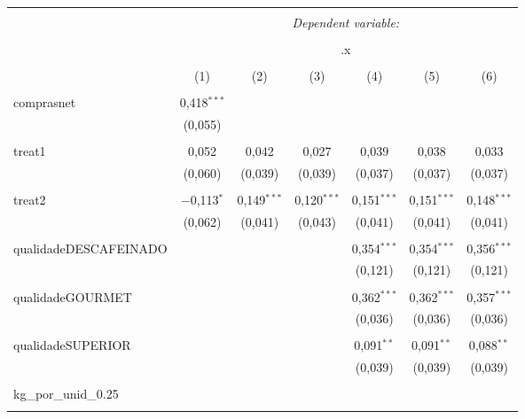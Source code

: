 
\begin{table}[!htbp] \centering 
  \caption{} 
  \label{} 
\begin{tabular}{@{\extracolsep{5pt}}lcccccc} 
\\[-1.8ex]\hline 
\hline \\[-1.8ex] 
 & \multicolumn{6}{c}{\textit{Dependent variable:}} \\ 
\cline{2-7} 
\\[-1.8ex] & \multicolumn{6}{c}{.x} \\ 
\\[-1.8ex] & (1) & (2) & (3) & (4) & (5) & (6)\\ 
\hline \\[-1.8ex] 
 comprasnet & 0,418$^{***}$ &  &  &  &  &  \\ 
  & (0,055) &  &  &  &  &  \\ 
  & & & & & & \\ 
 treat1 & 0,052 & 0,042 & 0,027 & 0,039 & 0,038 & 0,033 \\ 
  & (0,060) & (0,039) & (0,039) & (0,037) & (0,037) & (0,037) \\ 
  & & & & & & \\ 
 treat2 & $-$0,113$^{*}$ & 0,149$^{***}$ & 0,120$^{***}$ & 0,151$^{***}$ & 0,151$^{***}$ & 0,148$^{***}$ \\ 
  & (0,062) & (0,041) & (0,043) & (0,041) & (0,041) & (0,041) \\ 
  & & & & & & \\ 
 qualidadeDESCAFEINADO &  &  &  & 0,354$^{***}$ & 0,354$^{***}$ & 0,356$^{***}$ \\ 
  &  &  &  & (0,121) & (0,121) & (0,121) \\ 
  & & & & & & \\ 
 qualidadeGOURMET &  &  &  & 0,362$^{***}$ & 0,362$^{***}$ & 0,357$^{***}$ \\ 
  &  &  &  & (0,036) & (0,036) & (0,036) \\ 
  & & & & & & \\ 
 qualidadeSUPERIOR &  &  &  & 0,091$^{**}$ & 0,091$^{**}$ & 0,088$^{**}$ \\ 
  &  &  &  & (0,039) & (0,039) & (0,039) \\ 
  & & & & & & \\ 
 kg\_por\_unid\_0.25 &  &  &  &  &  &  \\ 
  &  &  &  &  &  &  \\ 

\end{tabular}
\end{table}

